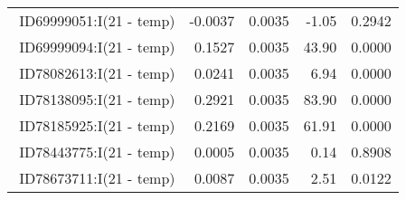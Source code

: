 \begin{table}[ht]
\begin{tabular}{rrrrr}
$$  ID69999051:I(21 - temp) & -0.0037 & 0.0035 & -1.05 & 0.2942 \\ 
  ID69999094:I(21 - temp) & 0.1527 & 0.0035 & 43.90 & 0.0000 \\ 
  ID78082613:I(21 - temp) & 0.0241 & 0.0035 & 6.94 & 0.0000 \\ 
  ID78138095:I(21 - temp) & 0.2921 & 0.0035 & 83.90 & 0.0000 \\ 
  ID78185925:I(21 - temp) & 0.2169 & 0.0035 & 61.91 & 0.0000 \\ 
  ID78443775:I(21 - temp) & 0.0005 & 0.0035 & 0.14 & 0.8908 \\ 
  ID78673711:I(21 - temp) & 0.0087 & 0.0035 & 2.51 & 0.0122 \\ 
   \hline
\end{tabular}
\end{table}
